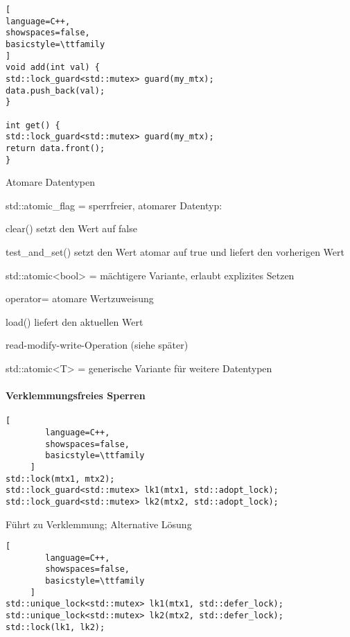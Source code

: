 \documentclass[10pt]{article}
\begin{document}
\begin{itemize*}
\begin{itemize*}
\begin{lstlisting}[
language=C++,
showspaces=false,
basicstyle=\ttfamily
]
void add(int val) {
std::lock_guard<std::mutex> guard(my_mtx);
data.push_back(val);
}

int get() {
std::lock_guard<std::mutex> guard(my_mtx);
return data.front();
}
\end{lstlisting}
  
  \item Atomare Datentypen
  \begin{itemize*}
    \item std::atomic\_flag = sperrfreier, atomarer Datentyp:
    \begin{itemize*}
      \item clear() setzt den Wert auf false
      \item test\_and\_set() setzt den Wert atomar auf true und liefert den vorherigen Wert
    \end{itemize*}
    \item std::atomic<bool> = mächtigere Variante, erlaubt explizites Setzen
    \begin{itemize*}
      \item operator= atomare Wertzuweisung
      \item load() liefert den aktuellen Wert
      \item read-modify-write-Operation (siehe später)
    \end{itemize*}
    \item std::atomic<T> = generische Variante für weitere Datentypen
  \end{itemize*}
\end{itemize*}

\paragraph{Verklemmungsfreies Sperren}
\begin{lstlisting}[
        language=C++,
        showspaces=false,
        basicstyle=\ttfamily
     ]
std::lock(mtx1, mtx2);
std::lock_guard<std::mutex> lk1(mtx1, std::adopt_lock);
std::lock_guard<std::mutex> lk2(mtx2, std::adopt_lock);
\end{lstlisting}
Führt zu Verklemmung; Alternative Lösung
\begin{lstlisting}[
        language=C++,
        showspaces=false,
        basicstyle=\ttfamily
     ]
std::unique_lock<std::mutex> lk1(mtx1, std::defer_lock);
std::unique_lock<std::mutex> lk2(mtx2, std::defer_lock);
std::lock(lk1, lk2);
\end{lstlisting}


\end{itemize*}
\end{document}
